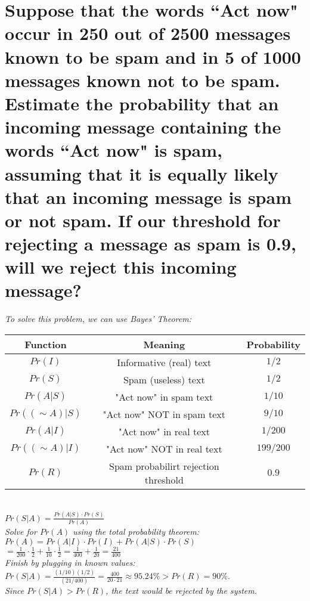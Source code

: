 \documentclass{article}
\begin{document}

\section{Suppose that the words ``Act now" occur in 250 out of 2500 messages known to be spam
    and in 5 of 1000 messages known not to be spam. Estimate the probability that an
    incoming message containing the words ``Act now" is spam, assuming that it is equally
    likely that an incoming message is spam or not spam. If our threshold for rejecting
    a message as spam is 0.9, will we reject this incoming message? \\}
\hspace{1cm}\textit{To solve this problem, we can use Bayes' Theorem:}
\begin{center}
    \begin{tabular}{c|c|c}
        Function & Meaning & Probability \\
        \hline
        $Pr(I)$ & Informative (real) text & $1/2$ \\
        $Pr(S)$ & Spam (useless) text & $1/2$ \\
        \hline
        $Pr(A|S)$ & "Act now" in spam text & $1/10$ \\
        $Pr((\sim A)|S)$ & "Act now" NOT in spam text & $9/10$ \\
        $Pr(A|I)$ & "Act now" in real text & $1/200$ \\
        $Pr((\sim A)|I)$ & "Act now" NOT in real text & $199/200$ \\
        \hline
        $Pr(R)$ & Spam probabilirt rejection threshold & $0.9$ \\
    \end{tabular} \\
    \vspace{0.25cm}
    $Pr(S|A) = \frac{Pr(A|S)\cdot Pr(S)}{Pr(A)}$ \\
    \vspace{0.25cm}
    \textit{Solve for $Pr(A)$ using the total probability theorem:} \\
    \vspace{0.25cm}
    $Pr(A) = Pr(A|I)\cdot Pr(I) + Pr(A|S)\cdot Pr(S)$ \\
    \vspace{0.25cm}
    $ = \frac{1}{200}\cdot \frac{1}{2} + \frac{1}{10}\cdot \frac{1}{2} = 
    \frac{1}{400} + \frac{1}{20} = \frac{21}{400}$ \\
    \vspace{0.25cm}
    \textit{Finish by plugging in known values:} \\
    \vspace{0.25cm}
    $ Pr(S|A) = \frac{(1/10)(1/2)}{(21/400)} = \frac{400}{20\cdot 21} 
        \approx 95.24\% > Pr(R) = 90\%$. \\
    \vspace{0.25cm}
    \textit{Since $Pr(S|A) > Pr(R)$, the text would be rejected by the system.}
\end{center}
\clearpage
\end{document}
